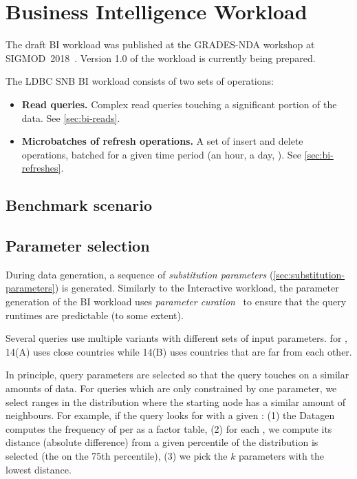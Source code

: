 \chapter{Business Intelligence Workload}
\label{sec:bi}

The draft BI workload was published at the \mbox{GRADES-NDA} workshop at \mbox{SIGMOD 2018}~\cite{DBLP:conf/grades/SzarnyasPAMPKEB18}.
Version 1.0 of the workload is currently being prepared.

The LDBC SNB BI workload consists of two sets of operations:

\begin{itemize}
\item \textbf{Read queries.} Complex read queries touching a significant portion of the data. See \autoref{sec:bi-reads}.
\item \textbf{Microbatches of refresh operations.} A set of insert and delete operations, batched for a given time period (\eg an hour, a day, \etc). See \autoref{sec:bi-refreshes}.
\end{itemize}

\section{Benchmark scenario}
\label{sec:bi-benchmark-scenario}

\section{Parameter selection}
\label{sec:bi-paramgen}

During data generation, a sequence of \emph{substitution parameters} (\autoref{sec:substitution-parameters}) is generated.
Similarly to the Interactive workload, the parameter generation of the BI workload uses \emph{parameter curation}~\cite{DBLP:conf/tpctc/GubichevB14} to ensure that the query runtimes are  predictable (to some extent).

Several queries use multiple variants with different sets of input parameters.
\Eg for , 14(A) uses close countries while 14(B) uses countries that are far from each other.

In principle, query parameters are selected so that the query touches on a similar amounts of data.
For queries which are only constrained by one parameter, we select ranges in the distribution where the starting node has a similar amount of neighbours.
For example, if the query looks for \tMessages with a given \tTag:
(1) the Datagen computes the frequency of \tMessages per \tTags as a factor table,
(2) for each \tTag, we compute its distance (absolute difference) from a given percentile of the distribution is selected (\eg the \tTag on the 75th percentile),
(3) we pick the $k$ parameters with the lowest distance.

